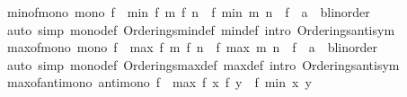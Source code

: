 \begin{isabellebody}
\ min{\isacharunderscore}{\kern0pt}of{\isacharunderscore}{\kern0pt}mono{\isacharcolon}{\kern0pt}\ {\isachardoublequoteopen}mono\ f\ {\isasymLongrightarrow}\ min\ {\isacharparenleft}{\kern0pt}f\ m{\isacharparenright}{\kern0pt}\ {\isacharparenleft}{\kern0pt}f\ n{\isacharparenright}{\kern0pt}\ {\isacharequal}{\kern0pt}\ f\ {\isacharparenleft}{\kern0pt}min\ m\ n{\isacharparenright}{\kern0pt}{\isachardoublequoteclose}\ \ f\ {\isacharcolon}{\kern0pt}{\isacharcolon}{\kern0pt}\ {\isachardoublequoteopen}{\isacharprime}{\kern0pt}a\ {\isasymRightarrow}\ {\isacharprime}{\kern0pt}b{\isacharcolon}{\kern0pt}{\isacharcolon}{\kern0pt}linorder{\isachardoublequoteclose}\isanewline
%
\isadelimproof
\ \ %
\endisadelimproof
%
\isatagproof
{}\isamarkupfalse%
\ {\isacharparenleft}{\kern0pt}auto\ simp{\isacharcolon}{\kern0pt}\ mono{\isacharunderscore}{\kern0pt}def\ Orderings{\isachardot}{\kern0pt}min{\isacharunderscore}{\kern0pt}def\ min{\isacharunderscore}{\kern0pt}def\ intro{\isacharcolon}{\kern0pt}\ Orderings{\isachardot}{\kern0pt}antisym{\isacharparenright}{\kern0pt}%
\endisatagproof
{\isafoldproof}%
%
\isadelimproof
\isanewline
%
\endisadelimproof
\isanewline
{}\isamarkupfalse%
\ max{\isacharunderscore}{\kern0pt}of{\isacharunderscore}{\kern0pt}mono{\isacharcolon}{\kern0pt}\ {\isachardoublequoteopen}mono\ f\ {\isasymLongrightarrow}\ max\ {\isacharparenleft}{\kern0pt}f\ m{\isacharparenright}{\kern0pt}\ {\isacharparenleft}{\kern0pt}f\ n{\isacharparenright}{\kern0pt}\ {\isacharequal}{\kern0pt}\ f\ {\isacharparenleft}{\kern0pt}max\ m\ n{\isacharparenright}{\kern0pt}{\isachardoublequoteclose}\ \ f\ {\isacharcolon}{\kern0pt}{\isacharcolon}{\kern0pt}\ {\isachardoublequoteopen}{\isacharprime}{\kern0pt}a\ {\isasymRightarrow}\ {\isacharprime}{\kern0pt}b{\isacharcolon}{\kern0pt}{\isacharcolon}{\kern0pt}linorder{\isachardoublequoteclose}\isanewline
%
\isadelimproof
\ \ %
\endisadelimproof
%
\isatagproof
{}\isamarkupfalse%
\ {\isacharparenleft}{\kern0pt}auto\ simp{\isacharcolon}{\kern0pt}\ mono{\isacharunderscore}{\kern0pt}def\ Orderings{\isachardot}{\kern0pt}max{\isacharunderscore}{\kern0pt}def\ max{\isacharunderscore}{\kern0pt}def\ intro{\isacharcolon}{\kern0pt}\ Orderings{\isachardot}{\kern0pt}antisym{\isacharparenright}{\kern0pt}%
\endisatagproof
{\isafoldproof}%
%
\isadelimproof
\isanewline
%
\endisadelimproof
\isanewline
{}\isamarkupfalse%
\isanewline
\isanewline
{}\isamarkupfalse%
\ max{\isacharunderscore}{\kern0pt}of{\isacharunderscore}{\kern0pt}antimono{\isacharcolon}{\kern0pt}\ {\isachardoublequoteopen}antimono\ f\ {\isasymLongrightarrow}\ max\ {\isacharparenleft}{\kern0pt}f\ x{\isacharparenright}{\kern0pt}\ {\isacharparenleft}{\kern0pt}f\ y{\isacharparenright}{\kern0pt}\ {\isacharequal}{\kern0pt}\ f\ {\isacharparenleft}{\kern0pt}min\ x\ y{\isacharparenright}{\kern0pt}{\isachardoublequoteclose}\isanewline

\end{isabellebody}
